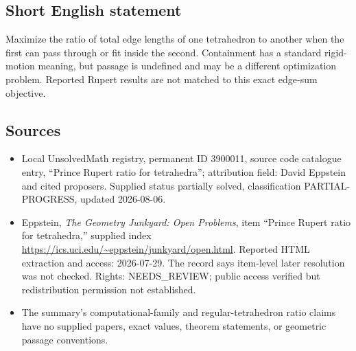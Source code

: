 \documentclass[11pt]{article}
\begin{document}
\subsection{Short English statement}
Maximize the ratio of total edge lengths of one tetrahedron to another when the first can pass through or fit inside the second. Containment has a standard rigid-motion meaning, but passage is undefined and may be a different optimization problem. Reported Rupert results are not matched to this exact edge-sum objective.
\subsection{Sources}
\begin{itemize}
\item Local UnsolvedMath registry, permanent ID 3900011, source code catalogue entry, ``Prince Rupert ratio for tetrahedra''; attribution field: David Eppstein and cited proposers. Supplied status partially solved, classification PARTIAL-PROGRESS, updated 2026-08-06.
\item Eppstein, \emph{The Geometry Junkyard: Open Problems}, item ``Prince Rupert ratio for tetrahedra,'' supplied index \url{https://ics.uci.edu/~eppstein/junkyard/open.html}. Reported HTML extraction and access: 2026-07-29. The record says item-level later resolution was not checked. Rights: NEEDS\_REVIEW; public access verified but redistribution permission not established.
\item The summary's computational-family and regular-tetrahedron ratio claims have no supplied papers, exact values, theorem statements, or geometric passage conventions.
\end{itemize}
\end{document}

